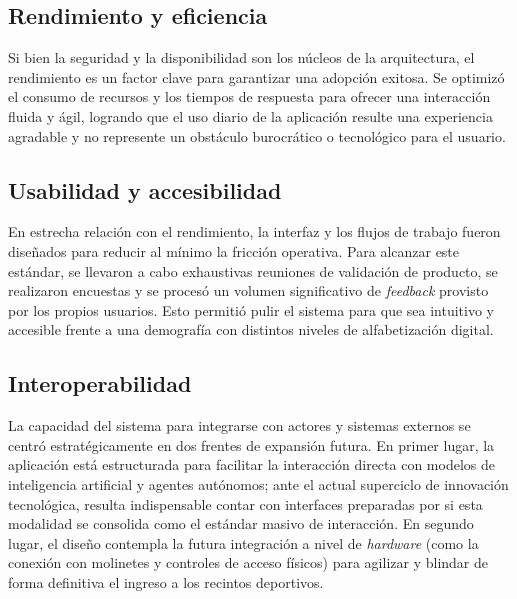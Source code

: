 \subsection{Rendimiento y eficiencia}

Si bien la seguridad y la disponibilidad son los núcleos de la arquitectura, el rendimiento es un factor clave para garantizar una adopción exitosa. Se optimizó el consumo de recursos y los tiempos de respuesta para ofrecer una interacción fluida y ágil, logrando que el uso diario de la aplicación resulte una experiencia agradable y no represente un obstáculo burocrático o tecnológico para el usuario.

\subsection{Usabilidad y accesibilidad}

En estrecha relación con el rendimiento, la interfaz y los flujos de trabajo fueron diseñados para reducir al mínimo la fricción operativa. Para alcanzar este estándar, se llevaron a cabo exhaustivas reuniones de validación de producto, se realizaron encuestas y se procesó un volumen significativo de \textit{feedback} provisto por los propios usuarios. Esto permitió pulir el sistema para que sea intuitivo y accesible frente a una demografía con distintos niveles de alfabetización digital.

\subsection{Interoperabilidad}

La capacidad del sistema para integrarse con actores y sistemas externos se centró estratégicamente en dos frentes de expansión futura. En primer lugar, la aplicación está estructurada para facilitar la interacción directa con modelos de inteligencia artificial y agentes autónomos; ante el actual superciclo de innovación tecnológica, resulta indispensable contar con interfaces preparadas por si esta modalidad se consolida como el estándar masivo de interacción. En segundo lugar, el diseño contempla la futura integración a nivel de \textit{hardware} (como la conexión con molinetes y controles de acceso físicos) para agilizar y blindar de forma definitiva el ingreso a los recintos deportivos.
